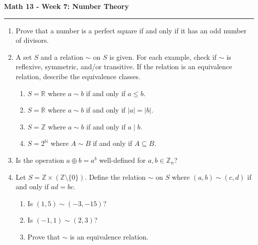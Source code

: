 \documentclass[12pt]{report}
\theoremstyle{definition}
\newcommand{\naturals}{\mathbb{N}}
\newcommand{\integers}{\mathbb{Z}}
\newcommand{\reals}{\mathbb{R}}
\begin{document}
\begin{center}
{\bf \Large Math 13 - Week 7: Number Theory}
\vspace{0.2cm}
\hrule
\end{center}

\begin{enumerate}

\item Prove that a number is a perfect square if and only if it has an odd number of divisors.

\vfill

\item A set $S$ and a relation $\sim$ on $S$ is given. For each example, check if $\sim$ is reflexive, symmetric, and/or transitive. If the relation is an equivalence relation, describe the equivalence classes.
\begin{enumerate}
	\item $S = \reals$ where $a\sim b$ if and only if $a\leq b$.

	\vfill

	\item $S = \reals$ where $a\sim b$ if and only if $|a| = |b|$.

	\vfill

	\item $S = \integers$ where $a\sim b$ if and only if $a\mid b$.

	\vfill

	\item $S = 2^\naturals$ where $A\sim B$ if and only if $A\subseteq B$.

	\vfill
\end{enumerate}


\item Is the operation $a\oplus b = a^b$ well-defined for $a,b\in \integers_n$?

\vfill

\item Let $S = \integers \times (\integers \setminus \{0\})$. Define the relation $\sim$ on $S$ where $(a,b)\sim (c,d)$ if and only if $ad=bc$.
\begin{enumerate}
	\item Is $(1,5)\sim (-3,-15)$?

	\vfill

	\item Is $(-1,1)\sim (2,3)$?

	\vfill

	\item Prove that $\sim$ is an equivalence relation.
	\vfill
\end{enumerate}
\end{enumerate}
\end{document}
